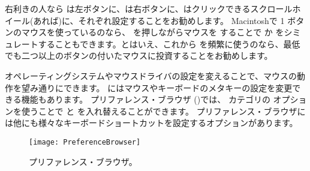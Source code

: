 \documentclass[a4paper,10pt,twoside]{book}
\begin{document}





右利きの人なら \click は左ボタンに、\actclick は右ボタンに、\metaclick はクリックできるスクロールホイール(あれば)に、それぞれ設定することをお勧めします。
Macintoshで 1 ボタンのマウスを使っているのなら、\clover{} を押しながらマウスを \click することで \actclick か \metaclick をシミュレートすることもできます。とはいえ、これから \pharo を頻繁に使うのなら、最低でも二つ以上のボタンの付いたマウスに投資することをお勧めします。

オペレーティングシステムやマウスドライバの設定を変えることで、マウスの動作を望み通りにできます。
\pharo にはマウスやキーボードのメタキーの設定を変更できる機能もあります。
プリファレンス・ブラウザ ()では、 カテゴリの  オプションを使うことで \actclick と \metaclick を入れ替えることができます。
プリファレンス・ブラウザには他にも様々なキーボードショートカットを設定するオプションがあります。

\begin{figure}[htb]
\centerline{\texttt{[image: PreferenceBrowser]}}
\caption{プリファレンス・ブラウザ。}
\end{figure}
\end{document}
